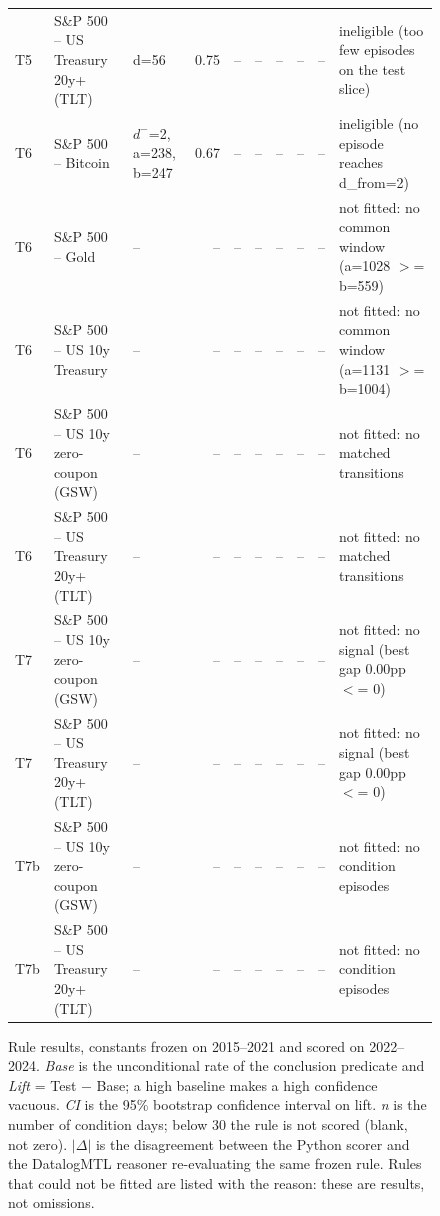 \begin{figure}
\begin{tabular}{lllrrrrrrl}
T5 & S\&P 500 -- US Treasury 20y+ (TLT) & d=56 & 0.75 & -- & -- & -- & -- & -- & ineligible (too few episodes on the test slice) \\
T6 & S\&P 500 -- Bitcoin & $d^-$=2, a=238, b=247 & 0.67 & -- & -- & -- & -- & -- & ineligible (no episode reaches d\_from=2) \\
T6 & S\&P 500 -- Gold & -- & -- & -- & -- & -- & -- & -- & not fitted: no common window (a=1028 $>$= b=559) \\
T6 & S\&P 500 -- US 10y Treasury & -- & -- & -- & -- & -- & -- & -- & not fitted: no common window (a=1131 $>$= b=1004) \\
T6 & S\&P 500 -- US 10y zero-coupon (GSW) & -- & -- & -- & -- & -- & -- & -- & not fitted: no matched transitions \\
T6 & S\&P 500 -- US Treasury 20y+ (TLT) & -- & -- & -- & -- & -- & -- & -- & not fitted: no matched transitions \\
T7 & S\&P 500 -- US 10y zero-coupon (GSW) & -- & -- & -- & -- & -- & -- & -- & not fitted: no signal (best gap 0.00pp $<$= 0) \\
T7 & S\&P 500 -- US Treasury 20y+ (TLT) & -- & -- & -- & -- & -- & -- & -- & not fitted: no signal (best gap 0.00pp $<$= 0) \\
T7b & S\&P 500 -- US 10y zero-coupon (GSW) & -- & -- & -- & -- & -- & -- & -- & not fitted: no condition episodes \\
T7b & S\&P 500 -- US Treasury 20y+ (TLT) & -- & -- & -- & -- & -- & -- & -- & not fitted: no condition episodes \\
\bottomrule
\end{tabular}
\caption{Rule results, constants frozen on 2015--2021 and scored on 2022--2024. \emph{Base} is the unconditional rate of the conclusion predicate and \emph{Lift} = Test $-$ Base; a high baseline makes a high confidence vacuous. \emph{CI} is the 95\% bootstrap confidence interval on lift. \emph{n} is the number of condition days; below 30 the rule is not scored (blank, not zero). $|\Delta|$ is the disagreement between the Python scorer and the DatalogMTL reasoner re-evaluating the same frozen rule. Rules that could not be fitted are listed with the reason: these are results, not omissions.}
\label{tab:rule-results_classifier}
\end{figure}
